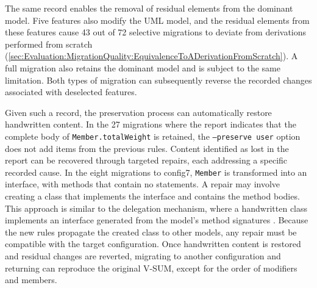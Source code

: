 The same record enables the removal of residual elements from the dominant model.
Five features also modify the UML model, and the residual elements from these features cause 43 out of 72 selective migrations to deviate from derivations performed from scratch (\autoref{sec:Evaluation:MigrationQuality:EquivalenceToADerivationFromScratch}).
A full migration also retains the dominant model and is subject to the same limitation.
Both types of migration can subsequently reverse the recorded changes associated with deselected features.

Given such a record, the preservation process can automatically restore handwritten content.
In the 27 migrations where the report indicates that the complete body of \texttt{Member.totalWeight} is retained, the \texttt{--preserve user} option does not add items from the previous rules.
Content identified as lost in the report can be recovered through targeted repairs, each addressing a specific recorded cause.
In the eight migrations to config7, \texttt{Member} is transformed into an interface, with methods that contain no statements.
A repair may involve creating a class that implements the interface and contains the method bodies.
This approach is similar to the delegation mechanism, where a handwritten class implements an interface generated from the model's method signatures \cite{greifenberg2015integration}.
Because the new rules propagate the created class to other models, any repair must be compatible with the target configuration.
Once handwritten content is restored and residual changes are reverted, migrating to another configuration and returning can reproduce the original V-SUM, except for the order of modifiers and members.
